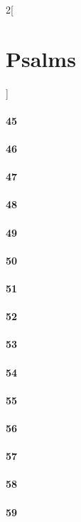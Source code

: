 \documentclass{book}
\begin{document}
\begin{multicols}{2}[\part{Psalms}]
\subsection*{45}
\subsection*{46}
\subsection*{47}
\subsection*{48}
\subsection*{49}
\subsection*{50}
\subsection*{51}
\subsection*{52}
\subsection*{53}
\subsection*{54}
\subsection*{55}
\subsection*{56}
\subsection*{57}
\subsection*{58}
\subsection*{59}

\end{multicols}
\end{document}

